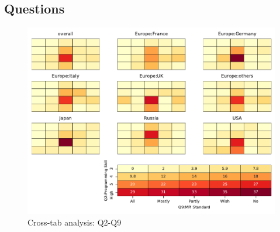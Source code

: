 
\subsection{Questions}


\begin{figure}
\begin{center}
\includegraphics[width=12cm]{../pdfs/Q2-Q9.pdf}
\caption{Cross-tab analysis: Q2-Q9}
\label{fig:Q2-Q9}
\end{center}
\end{figure}
